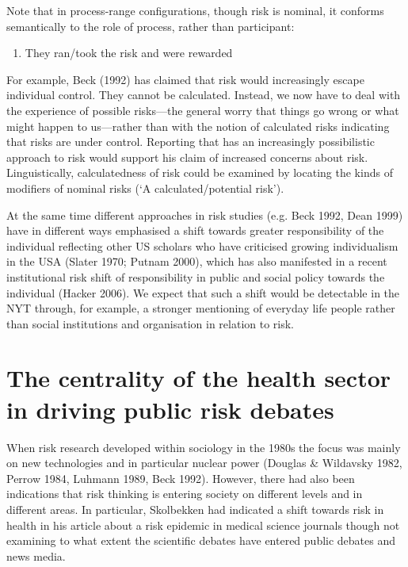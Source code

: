 Note that in process-range configurations, though risk is nominal, it conforms semantically to the role of process, rather than participant:

\begin{enumerate} [before=\color{black}\ttfamily] \setlength\itemsep{0em} \small
\item They ran\slash took the risk and were rewarded
\end{enumerate}

For example, Beck (1992) has claimed that risk would increasingly escape individual control. They cannot be calculated. Instead, we now have to deal with the experience of possible risks---the general worry that things go wrong or what might happen to us---rather than with the notion of calculated risks indicating that risks are under control. Reporting that has an increasingly possibilistic approach to risk would support his claim of increased concerns about risk. Linguistically, calculatedness of risk could be examined by locating the kinds of modifiers of nominal risks (`A calculated\slash potential risk').

At the same time different approaches in risk studies (e.g. Beck 1992, Dean 1999) have in different ways emphasised a shift towards greater responsibility of the individual reflecting other US scholars who have criticised growing individualism in the USA (Slater 1970; Putnam 2000), which has also manifested in a recent institutional risk shift of responsibility in public and social policy towards the individual (Hacker 2006). We expect that such a shift would be detectable in the NYT through, for example, a stronger mentioning of everyday life people rather than social institutions and organisation in relation to risk.

\section{The centrality of the health sector in driving public risk debates}

When risk research developed within sociology in the 1980s the focus was mainly on new technologies and in particular nuclear power (Douglas \& Wildavsky 1982, Perrow 1984, Luhmann 1989, Beck 1992). However, there had also been indications that risk thinking is entering society on different levels and in different areas. In particular, Skolbekken had indicated a shift towards risk in health in his article about a risk epidemic in medical science journals though not examining to what extent the scientific debates have entered public debates and news media. 

